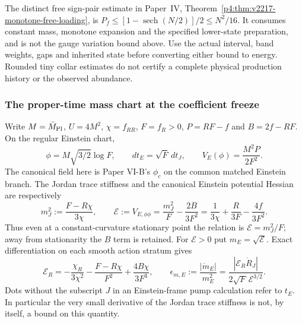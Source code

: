 \documentclass[12pt,a4paper]{article}
\begin{document}
\begin{remark}
\label{p9:rem:v2217-free-pair-loading-readout}
The distinct free sign-pair estimate in Paper~IV,
Theorem~\ref{p4:thm:v2217-monotone-free-loading}, is
$P_f\le[1-\operatorname{sech}(N/2)]/2\le N^2/16$.
It consumes constant mass, monotone expansion and the specified lower-state
preparation, and is not the gauge variation bound above. Use the actual
interval, band weights, gaps and inherited state before converting either
bound to energy. Rounded tiny collar estimates do not certify a complete
physical production history or the observed abundance.
\end{remark}


\subsubsection{The proper-time mass chart at the coefficient freeze}
\label{p9:sec:v215-mass-chart}
Write $M=\bar M_{\rm Pl}$, $U=4M^2$, $\chi=f_{RR}$,
$F=f_R>0$, $P=RF-f$ and $B=2f-RF$. On the regular Einstein chart,
\[
 \phi=M\sqrt{3/2}\log F,\qquad dt_E=\sqrt F\,dt_J,
 \qquad V_E(\phi)=\frac{M^2P}{2F^2}.
\]
The canonical field here is Paper VI-B's $\phi_c$ on the common
matched Einstein branch. The Jordan trace stiffness and the canonical
Einstein potential Hessian are respectively
\[
 m_J^2:=\frac{F-R\chi}{3\chi},\qquad
 \mathcal E:=V_{E,\phi\phi}
 =\frac{m_J^2}{F}-\frac{2B}{3F^2}
 =\frac1{3\chi}+\frac R{3F}-\frac{4f}{3F^2}.
\tag{MC.1}\label{p9:eq:v215-einstein-mass-chart}
\]
Thus even at a constant-curvature stationary point the relation is
$\mathcal E=m_J^2/F$; away from stationarity the $B$ term is retained.
For $\mathcal E>0$ put $m_E=\sqrt{\mathcal E}$. Exact differentiation
on each smooth action stratum gives
\[
 \mathcal E_R=-\frac{\chi_R}{3\chi^2}
       -\frac{F-R\chi}{F^2}+\frac{4B\chi}{3F^3},\qquad
 \boxed{\epsilon_{m,E}:=\frac{|\dot m_E|}{m_E^2}
 =\frac{|\mathcal E_R\dot R_J|}
              {2\sqrt F\,\mathcal E^{3/2}}.}
\tag{MC.2}\label{p9:eq:v215-einstein-mass-adiabaticity}
\]
Dots without the subscript $J$ in an Einstein-frame pump calculation
refer to $t_E$. In particular the very small derivative of the Jordan
trace stiffness is not, by itself, a bound on this quantity.
\end{document}
